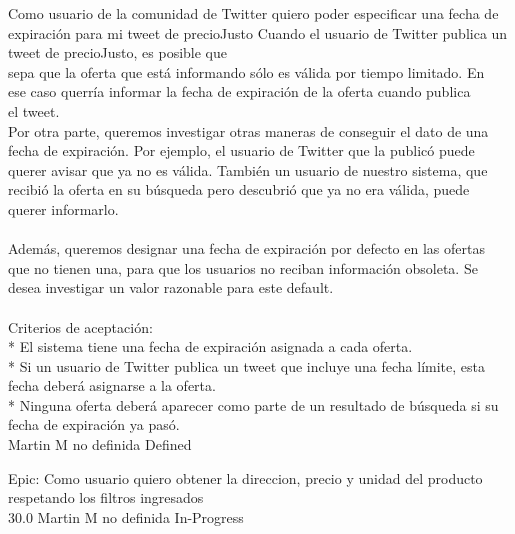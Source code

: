 \vspace{20pt}

	{Como usuario de la comunidad de Twitter quiero poder especificar una fecha de expiración para mi tweet de precioJusto} %
	{Cuando el usuario de Twitter publica un tweet de precioJusto, es posible que\\
sepa que la oferta que está informando sólo es válida por tiempo limitado. En\\
ese caso querría informar la fecha de expiración de la oferta cuando publica\\
el tweet.\\
Por otra parte, queremos investigar otras maneras de conseguir el dato de una\\
fecha de expiración. Por ejemplo, el usuario de Twitter que la publicó puede\\
querer avisar que ya no es válida. También un usuario de nuestro sistema, que\\
recibió la oferta en su búsqueda pero descubrió que ya no era válida, puede\\
querer informarlo.\\
  \\
Además, queremos designar una fecha de expiración por defecto en las ofertas\\
que no tienen una, para que los usuarios no reciban información obsoleta. Se\\
desea investigar un valor razonable para este default.\\
  \\
Criterios de aceptación:\\
* El sistema tiene una fecha de expiración asignada a cada oferta.  \\
* Si un usuario de Twitter publica un tweet que incluye una fecha límite, esta fecha deberá asignarse a la oferta.  \\
* Ninguna oferta deberá aparecer como parte de un resultado de búsqueda si su fecha de expiración ya pasó.\\
} %
	{} %
	{} %
	{Martin M} %
	{no definida} %
	{Defined} %


\vspace{20pt}

	{Epic: Como usuario quiero obtener la direccion, precio y unidad del producto respetando los filtros ingresados} %
	{\\
} %
	{} %
	{30.0} %
	{Martin M} %
	{no definida} %
	{In-Progress} %


